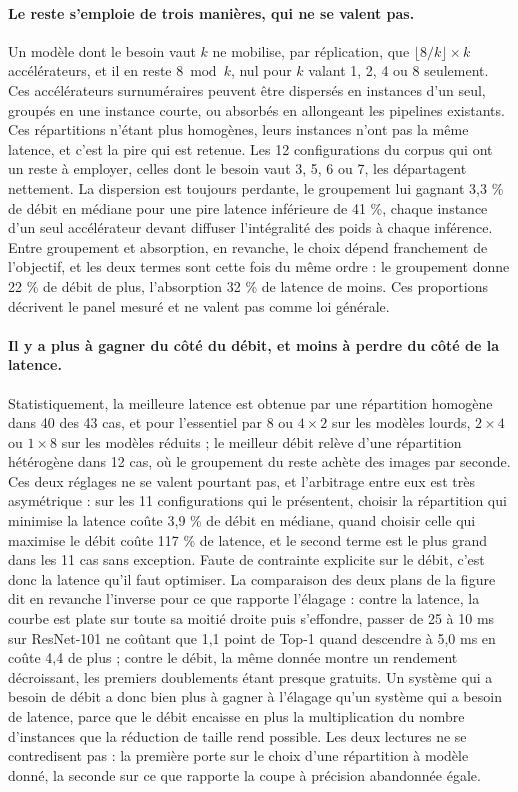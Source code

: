 \documentclass[11pt,a4paper]{report}
\begin{document}
\paragraph{Le reste s'emploie de trois manières, qui ne se valent pas.} Un modèle dont le besoin vaut $k$ ne mobilise, par réplication, que $\lfloor 8/k \rfloor \times k$ accélérateurs, et il en reste $8 \bmod k$, nul pour $k$ valant 1, 2, 4 ou 8 seulement. Ces accélérateurs surnuméraires peuvent être dispersés en instances d'un seul, groupés en une instance courte, ou absorbés en allongeant les pipelines existants. Ces répartitions n'étant plus homogènes, leurs instances n'ont pas la même latence, et c'est la pire qui est retenue. Les 12 configurations du corpus qui ont un reste à employer, celles dont le besoin vaut 3, 5, 6 ou 7, les départagent nettement. La dispersion est toujours perdante, le groupement lui gagnant 3,3 \% de débit en médiane pour une pire latence inférieure de 41 \%, chaque instance d'un seul accélérateur devant diffuser l'intégralité des poids à chaque inférence. Entre groupement et absorption, en revanche, le choix dépend franchement de l'objectif, et les deux termes sont cette fois du même ordre : le groupement donne 22 \% de débit de plus, l'absorption 32 \% de latence de moins. Ces proportions décrivent le panel mesuré et ne valent pas comme loi générale.

\paragraph{Il y a plus à gagner du côté du débit, et moins à perdre du côté de la latence.} Statistiquement, la meilleure latence est obtenue par une répartition homogène dans 40 des 43 cas, et pour l'essentiel par $8$ ou $4\times2$ sur les modèles lourds, $2\times4$ ou $1\times8$ sur les modèles réduits ; le meilleur débit relève d'une répartition hétérogène dans 12 cas, où le groupement du reste achète des images par seconde. Ces deux réglages ne se valent pourtant pas, et l'arbitrage entre eux est très asymétrique : sur les 11 configurations qui le présentent, choisir la répartition qui minimise la latence coûte 3,9 \% de débit en médiane, quand choisir celle qui maximise le débit coûte 117 \% de latence, et le second terme est le plus grand dans les 11 cas sans exception. Faute de contrainte explicite sur le débit, c'est donc la latence qu'il faut optimiser. La comparaison des deux plans de la figure dit en revanche l'inverse pour ce que rapporte l'élagage : contre la latence, la courbe est plate sur toute sa moitié droite puis s'effondre, passer de 25 à 10 ms sur ResNet-101 ne coûtant que 1,1 point de Top-1 quand descendre à 5,0 ms en coûte 4,4 de plus ; contre le débit, la même donnée montre un rendement décroissant, les premiers doublements étant presque gratuits. Un système qui a besoin de débit a donc bien plus à gagner à l'élagage qu'un système qui a besoin de latence, parce que le débit encaisse en plus la multiplication du nombre d'instances que la réduction de taille rend possible. Les deux lectures ne se contredisent pas : la première porte sur le choix d'une répartition à modèle donné, la seconde sur ce que rapporte la coupe à précision abandonnée égale.
\end{document}
